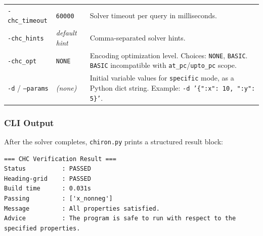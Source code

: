 \begin{longtable}{p{3.0cm} p{2.2cm} p{10.5cm}}
\addlinespace
\texttt{-chc\_timeout} & \texttt{60000} & Solver timeout per query in milliseconds. \\
\addlinespace
\texttt{-chc\_hints} & \textit{default hint} & Comma-separated solver hints. \\
\addlinespace
\texttt{-chc\_opt} & \texttt{NONE} & Encoding optimization level. Choices: \texttt{NONE}, \texttt{BASIC}. \texttt{BASIC} incompatible with \texttt{at\_pc}/\texttt{upto\_pc} scope. \\
\addlinespace
\texttt{-d} / \texttt{--params} & \textit{(none)} & Initial variable values for \texttt{specific} mode, as a Python dict string. Example: \texttt{-d '\{":x": 10, ":y": 5\}'}. \\
\bottomrule
\end{longtable}

\subsubsection*{CLI Output}

After the solver completes, \texttt{chiron.py} prints a structured result block:

\begin{lstlisting}[style=terminal]
=== CHC Verification Result ===
Status          : PASSED
Heading-grid    : PASSED
Build time      : 0.031s
Passing         : ['x_nonneg']
Message         : All properties satisfied.
Advice          : The program is safe to run with respect to the specified properties.
\end{lstlisting}
